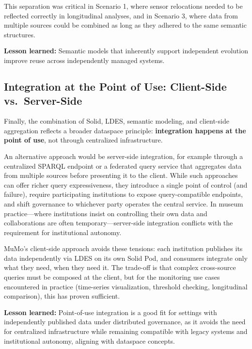 This separation was critical in Scenario 1, where sensor relocations
needed to be reflected correctly in longitudinal analyses, and in
Scenario 3, where data from multiple sources could be combined as long
as they adhered to the same semantic structures.

\textbf{Lesson learned:} Semantic models that inherently support
independent evolution improve reuse across independently managed
systems.

\subsection{Integration at the Point of Use: Client-Side
vs.~Server-Side}\label{integration-at-the-point-of-use-client-side-vs.-server-side}

Finally, the combination of Solid, LDES, semantic modeling, and
client-side aggregation reflects a broader dataspace principle:
\textbf{integration happens at the point of use}, not through
centralized infrastructure.

An alternative approach would be server-side integration, for example
through a centralized SPARQL endpoint or a federated query service that
aggregates data from multiple sources before presenting it to the
client. While such approaches can offer richer query expressiveness,
they introduce a single point of control (and failure), require
participating institutions to expose query-compatible endpoints, and
shift governance to whichever party operates the central service. In
museum practice---where institutions insist on controlling their own
data and collaborations are often temporary---server-side integration
conflicts with the requirement for institutional autonomy.

MuMo's client-side approach avoids these tensions: each institution
publishes its data independently via LDES on its own Solid Pod, and
consumers integrate only what they need, when they need it. The
trade-off is that complex cross-source queries must be composed at the
client, but for the monitoring use cases encountered in practice
(time-series visualization, threshold checking, longitudinal
comparison), this has proven sufficient.

\textbf{Lesson learned:} Point-of-use integration is a good fit for
settings with independently published data under distributed governance,
as it avoids the need for centralized infrastructure while remaining
compatible with legacy systems and institutional autonomy, aligning with
dataspace concepts.

